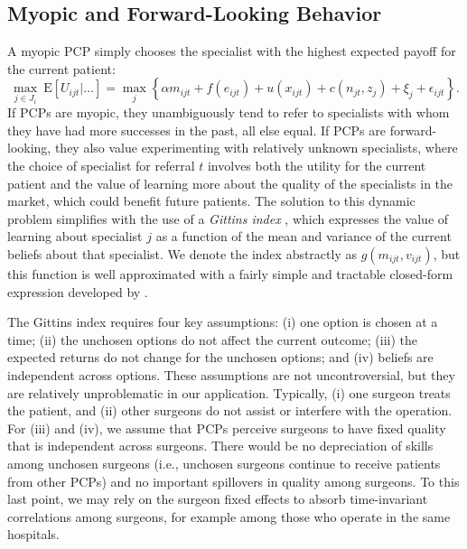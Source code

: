 \documentclass[12pt]{article}
\begin{document}
\subsection{Myopic and Forward-Looking Behavior}
A myopic PCP simply chooses the specialist with the highest expected payoff for the current patient:
\begin{equation}
\max_{j \in J_i} \ \text{E} \left[ U_{ijt} | \dots \right]
= \max_j \left\{ \alpha m_{ijt} + f(e_{ijt}) + u(x_{ijt}) + c(n_{jt}, z_j) + \xi_j + \epsilon_{ijt} \right\} .
\label{eqn:myopic}
\end{equation}
If PCPs are myopic, they unambiguously tend to refer to specialists with whom they have had more successes in the past, all else equal. If PCPs are forward-looking, they also value experimenting with relatively unknown specialists, where the choice of specialist for referral $t$ involves both the utility for the current patient and the value of learning more about the quality of the specialists in the market, which could benefit future patients. The solution to this dynamic problem simplifies with the use of a \emph{Gittins index} \citep{gittins1979, gittins1979bio}, which expresses the value of learning about specialist $j$ as a function of the mean and variance of the current beliefs about that specialist. We denote the index abstractly as $g(m_{ijt}, v_{ijt})$, but this function is well approximated with a fairly simple and tractable closed-form expression developed by \cite{brezzi2002}. 

The Gittins index requires four key assumptions: (i) one option is chosen at a time; (ii) the unchosen options do not affect the current outcome; (iii) the expected returns do not change for the unchosen options; and (iv) beliefs are independent across options. These assumptions are not uncontroversial, but they are relatively unproblematic in our application. Typically, (i) one surgeon treats the patient, and (ii) other surgeons do not assist or interfere with the operation. For (iii) and (iv), we assume that PCPs perceive surgeons to have fixed quality that is independent across surgeons.  There would be no depreciation of skills among unchosen surgeons (i.e., unchosen surgeons continue to receive patients from other PCPs) and no important spillovers in quality among surgeons. To this last point, we may rely on the surgeon fixed effects to absorb time-invariant correlations among surgeons, for example among those who operate in the same hospitals.
\end{document}
